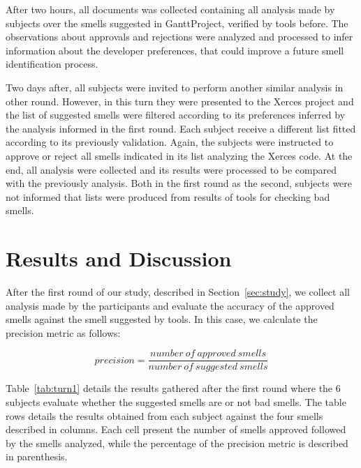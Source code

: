 \documentclass[conference]{IEEEtran}
\begin{document}
After two hours, all documents was collected containing all analysis made by subjects over the smells suggested in GanttProject, verified by tools before. The observations about approvals and rejections were analyzed and processed to infer information about the developer preferences, that could improve a future smell identification process. 

Two days after, all subjects were invited to perform another similar analysis in other round. However, in this turn they were presented to the Xerces project and the list of suggested smells were filtered according to its preferences inferred by the analysis informed in the first round. Each subject receive a different list fitted according to its previously validation. Again, the subjects were instructed to approve or reject all smells indicated in its list analyzing the Xerces code. At the end, all analysis were collected and its results were processed to be compared with the previously analysis. Both in the first round as the second, subjects were not informed that lists were produced from results of tools for checking bad smells.


% 


\section{Results and Discussion}
\label{sec:results}

After the first round of our study, described in Section~\ref{sec:study}, we collect all analysis made by the participants and evaluate the accuracy of the approved smells against the smell suggested by tools. In this case, we calculate the precision metric as follows:

\begin{equation*}
 precision = \frac{number~of~approved~smells}{number~of~suggested~smells}
\end{equation*}

Table~\ref{tab:turn1} details the results gathered after the first round where the 6 subjects evaluate whether the suggested smells are or not bad smells. The table rows details the results obtained from each subject against the four smells described in columns. Each cell present the number of smells approved followed by the smells analyzed, while the percentage of the precision metric is described in parenthesis.
\end{document}
